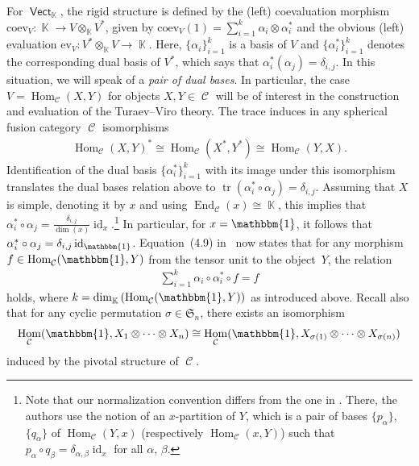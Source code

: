 \documentclass[pdftex]{sigma}
\DeclareMathOperator{\id}{id}
\DeclareMathOperator{\End}{End}
\DeclareMathOperator{\Hom}{Hom}
\DeclareMathOperator{\tr}{tr}
\DeclareMathOperator{\vect}{\mathsf{Vect}}
\DeclareMathOperator{\K}{\mathbb{K}}
\DeclareMathOperator{\calc}{\mathcal{C}}
\numberwithin{equation}{section}
\theoremstyle{definition}
\begin{document}
For $\vect_{\K}$, the rigid structure is defined by the (left) coevaluation morphism $\mathrm{coev}_{V}\colon \K \rightarrow V \otimes_{\K} V^*$, given by $\mathrm{coev}_V(1) = \sum_{i = 1}^k\alpha_i \otimes \alpha_i^*$ and the obvious (left) evaluation $\mathrm{ev}_V\colon V^* \otimes_{\K} V \rightarrow \K$. Here, $\{\alpha_i\}_{i = 1}^k$ is a basis of $V$ and $\{\alpha_i^*\}_{i = 1}^k$ denotes the corresponding dual basis of $V^*$, which says that $\alpha_i^*(\alpha_j) = \delta_{i,j}$. In this situation, we will speak of a \textit{pair of dual bases}. In particular, the case $V = \Hom_{\calc}(X, Y)$ for objects $X, Y \in \calc$ will be of interest in the construction and evaluation of the Turaev--Viro theory. The trace induces in any spherical fusion category $\calc$ isomorphisms
\begin{align}
 \label{eqDual}
 \Hom_{\calc}(X, Y)^* \cong \Hom_{\calc}(X^*, Y^*) \cong \Hom_{\calc}(Y, X).
\end{align}
Identification of the dual basis $\{\alpha_i^*\}_{i = 1}^k$ with its image under this isomorphism translates the dual bases relation above to $\tr(\alpha_i^* \circ \alpha_j) = \delta_{i,j}$. Assuming that $X$ is simple, denoting it by $x$ and using $\End_{\calc}(x) \cong \K$, this implies that $\alpha_i^* \circ \alpha_j = \frac{\delta_{i,j}}{\dim(x)}\id_x$.\footnote{Note that our normalization convention differs from the one in \cite[Section~4.4.1]{TV}. There, the authors use the notion of an $x$-partition of $Y$, which is a pair of bases $\{p_{\alpha}\}$, $\{q_{\alpha}\}$ of $\Hom_{\calc}(Y, x)$ (respectively $\Hom_{\calc}(x, Y)$) such that $p_{\alpha} \circ q_{\beta} = \delta_{\alpha, \beta}\id_x$ for all $\alpha$, $\beta$.} In particular, for $x = \mathbbm{1}$, it follows that $\alpha_i^* \circ \alpha_j = \delta_{i,j} \id_{\mathbbm{1}}$. Equation~(4.9) in~\cite{TV} now states that for any morphism $f \in \Hom_{\calc}(\mathbbm{1}, Y)$ from the tensor unit to the object~$Y$, the relation
\begin{align}
\label{eqTV49}
 \sum_{i = 1}^k \alpha_i \circ \alpha_i^* \circ f = f
\end{align}
holds, where $k = \dim_{\K}\left(\Hom_{\calc}(\mathbbm{1}, Y)\right)$ as introduced above. Recall also that for any cyclic permutation $\sigma \in \mathfrak{S}_n$, there exists an isomorphism
\begin{align}
 \label{eqCycl}
 \Hom_{\calc}(\mathbbm{1}, X_1 \otimes \dots \otimes X_n) \cong \Hom_{\calc}(\mathbbm{1}, X_{\sigma(1)} \otimes \dots \otimes X_{\sigma(n)})
\end{align}
induced by the pivotal structure of $\calc$.
\end{document}
